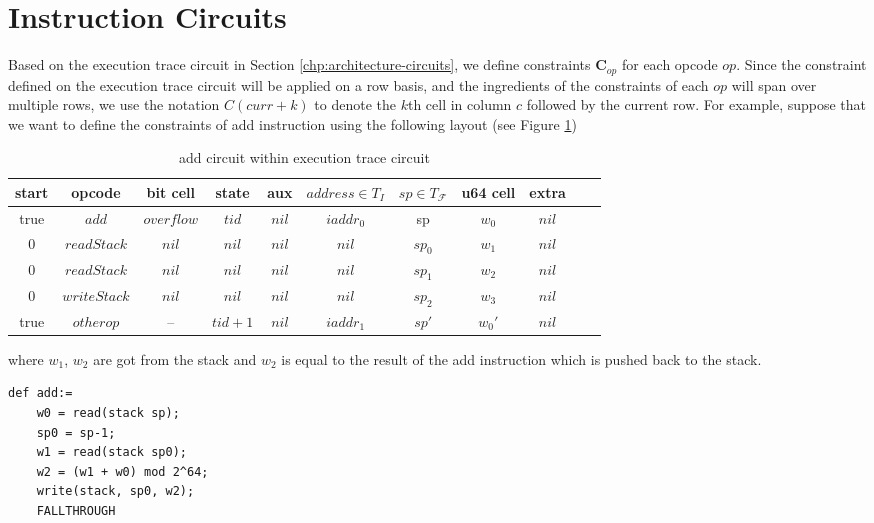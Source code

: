 \section{Instruction Circuits}
\label{chp:instruction-circuits}
Based on the execution trace circuit in Section \ref{chp:architecture-circuits}, we define constraints $\mathbf{C}_{op}$ for each opcode $op$. Since the constraint defined on the execution trace circuit will be applied on a row basis, and the ingredients of the constraints of each $op$ will span over multiple rows, we use the notation $C(curr+k)$ to denote the $k$th cell in column $c$ followed by the current row. For example, suppose that we want to define the constraints of add instruction using the following layout (see Figure \ref{tbl:add-instruction})
\begin{table}[h]
\begin{center}
\begin{tabular}{ | c | c | c | c | c | c | c | c | c | c | c | }
  \hline
  start & opcode & bit cell & state & aux & $address \in T_{I}$ & $sp \in T_\mathcal{F}$& u64 cell & extra \\ 
  \hline
   true & $add$ & $overflow$ & $tid$ & $nil$ & $iaddr_0$ & sp & $w_0$ & $nil$\\ 
 \hline
   0 & $readStack$ & $nil$ & $nil$ & $nil$ & $nil$ & $sp_0$ & $w_1$ & $nil$\\ 
 \hline
   0 & $readStack$ & $nil$ & $nil$ & $nil$ & $nil$ & $sp_1$ & $w_2$ & $nil$\\ 
 \hline
   0 & $writeStack$ & $nil$ & $nil$ & $nil$ & $nil$ & $sp_2$ & $w_3$ & $nil$\\ 
 \hline
   true & $otherop$ & -- & $tid+1$ & $nil$ & $iaddr_1$ & $sp'$ & $w_0'$ & $nil$\\
 \hline
\end{tabular}
\caption{add circuit within execution trace circuit}
\label{tbl:add-instruction}
\end{center}
\end{table}

\noindent where $w_1$, $w_2$ are got from the stack and $w_2$ is equal to the result of the add instruction which is pushed back to the stack.
\begin{verbatim}
def add:=
    w0 = read(stack sp);
    sp0 = sp-1;
    w1 = read(stack sp0);
    w2 = (w1 + w0) mod 2^64;
    write(stack, sp0, w2);
    FALLTHROUGH
\end{verbatim}

